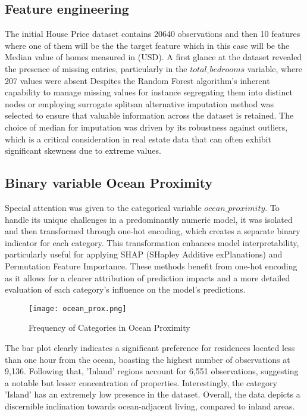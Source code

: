\documentclass[12pt]{article}
\begin{document}
\subsection{Feature engineering}
The initial House Price dataset contains 20640 observations and then 10 features where one of them will be the the target feature which in this case will be the Median value of homes measured in (USD).
A first glance at the dataset revealed the presence of missing entries, particularly in the $total\_bedrooms$ variable, where 207 values were absent
Despites the Random Forest algorithm's inherent capability to manage missing values for instance segregating them into distinct nodes or employing surrogate splitsan alternative imputation method was selected to ensure that valuable information across the dataset is retained.
The choice of median for imputation was driven by its robustness against outliers, which is a critical consideration in real estate data that can often exhibit significant skewness due to extreme values.


\subsection{Binary variable Ocean Proximity}
Special attention was given to the categorical variable $ocean\_proximity$.  To handle its unique challenges in a predominantly numeric model, it was isolated and then transformed through one-hot encoding, which creates a separate binary indicator for each category.
This transformation enhances model interpretability, particularly useful for applying SHAP (SHapley Additive exPlanations) and Permutation Feature Importance. These methods benefit from one-hot encoding as it allows for a clearer attribution of prediction impacts and a more detailed evaluation of each category's influence on the model's predictions.
\begin{figure}[htbp]
	\centering
	\texttt{[image: ocean\_prox.png]}
	\caption{Frequency of Categories in Ocean Proximity}
	\label{fig:oceanprox}
\end{figure}
The bar plot clearly indicates a significant preference for residences located less than one hour from the ocean, boasting the highest number of observations at 9,136. Following that, 'Inland' regions account for 6,551 observations, suggesting a notable but lesser concentration of properties. Interestingly, the category 'Island' has an extremely low presence in the dataset. Overall, the data depicts a discernible inclination towards ocean-adjacent living, compared to inland areas.
\end{document}
